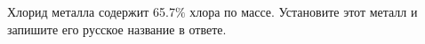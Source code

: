 
Хлорид металла содержит 65.7$\%$ хлора по массе. Установите этот металл и запишите его русское название в ответе.

